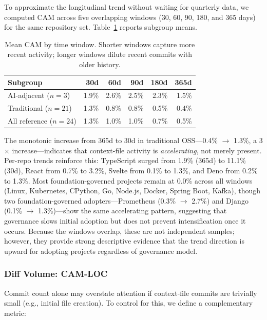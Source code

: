 \documentclass[12pt]{article}
\begin{document}
To approximate the longitudinal trend without waiting for quarterly data, we computed CAM across five overlapping windows (30, 60, 90, 180, and 365 days) for the same repository set. Table~\ref{tab:cam-temporal} reports subgroup means.

\begin{table}[ht]
\centering
\small
\begin{tabularx}{\textwidth}{lrrrrr}
\toprule
\textbf{Subgroup} & \textbf{30d} & \textbf{60d} & \textbf{90d} & \textbf{180d} & \textbf{365d} \\
\midrule
AI-adjacent ($n=3$) & 1.9\% & 2.6\% & 2.5\% & 2.3\% & 1.5\% \\
Traditional ($n=21$) & 1.3\% & 0.8\% & 0.8\% & 0.5\% & 0.4\% \\
All reference ($n=24$) & 1.3\% & 1.0\% & 1.0\% & 0.7\% & 0.5\% \\
\bottomrule
\end{tabularx}
\caption{Mean CAM by time window. Shorter windows capture more recent activity; longer windows dilute recent commits with older history.}
\label{tab:cam-temporal}
\end{table}

The monotonic increase from 365d to 30d in traditional OSS---0.4\% $\to$ 1.3\%, a 3$\times$ increase---indicates that context-file activity is \textit{accelerating}, not merely present. Per-repo trends reinforce this: TypeScript surged from 1.9\% (365d) to 11.1\% (30d), React from 0.7\% to 3.2\%, Svelte from 0.1\% to 1.3\%, and Deno from 0.2\% to 1.3\%. Most foundation-governed projects remain at 0.0\% across all windows (Linux, Kubernetes, CPython, Go, Node.js, Docker, Spring Boot, Kafka), though two foundation-governed adopters---Prometheus (0.3\% $\to$ 2.7\%) and Django (0.1\% $\to$ 1.3\%)---show the same accelerating pattern, suggesting that governance slows initial adoption but does not prevent intensification once it occurs. Because the windows overlap, these are not independent samples; however, they provide strong descriptive evidence that the trend direction is upward for adopting projects regardless of governance model.

\subsubsection{Diff Volume: CAM-LOC}

Commit count alone may overstate attention if context-file commits are trivially small (e.g., initial file creation). To control for this, we define a complementary metric:
\end{document}
